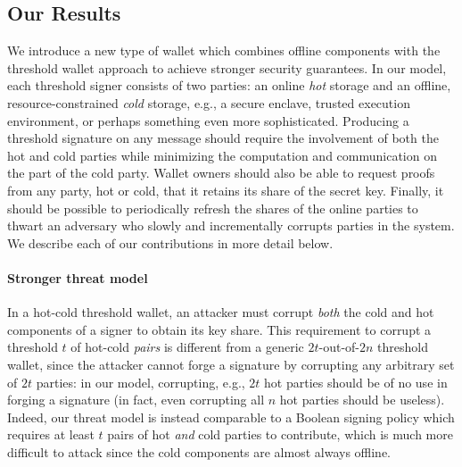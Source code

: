 \subsection{Our Results}

We introduce a new type of wallet which combines offline components with the threshold wallet approach to achieve stronger security guarantees. In our model, each threshold signer consists of two parties: an online \emph{hot} storage and an offline, resource-constrained \emph{cold} storage, e.g., a secure enclave, trusted execution environment, or perhaps something even more sophisticated.  Producing a threshold signature on any message should require the involvement of both the hot and cold parties while minimizing the computation and communication on the part of the cold party. Wallet owners should also be able to request proofs from any party, hot or cold, that it retains its share of the secret key. Finally, it should be possible to periodically refresh the shares of the online parties to thwart an adversary who slowly and incrementally corrupts parties in the system. We describe each of our contributions in more detail below.

\paragraph{Stronger threat model}
In a hot-cold threshold wallet, an attacker must corrupt \emph{both} the cold and hot components of a signer to obtain its key share.
This requirement to corrupt a threshold $t$ of hot-cold \emph{pairs} is different from a generic $2t$-out-of-$2n$ threshold wallet, since the attacker cannot forge a signature by corrupting any arbitrary set of $2t$ parties: in our model, corrupting, e.g., $2t$ hot parties should be of no use in forging a signature (in fact, even corrupting all $n$ hot parties should be useless). Indeed, our threat model is instead comparable to a Boolean signing policy which requires at least $t$ pairs of hot \emph{and} cold parties to contribute, which is much more difficult to attack since the cold components are almost always offline. %


